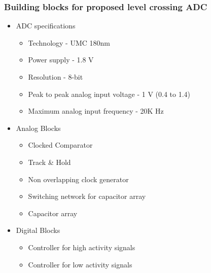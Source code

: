 \documentclass{beamer}
\begin{document}
\begin{frame}
	\frametitle{Building blocks for proposed level crossing ADC} \footnotesize
	\begin{itemize} 
		\item{ ADC specifications}
			\begin{itemize} \scriptsize
				\item{ Technology - UMC 180nm } \\
				\item{ Power supply - 1.8 V } \\
				\item{ Resolution - 8-bit  } \\
				\item{ Peak to peak analog input voltage - 1 V (0.4 to 1.4)} \\
				\item{ Maximum analog input frequency - 20K Hz } \\
			\end{itemize}
		\item{ Analog Blocks }\\
			\begin{itemize} \scriptsize
				\item{ Clocked Comparator } \\
				\item{ Track \& Hold } \\
				\item{ Non overlapping clock generator } \\
				\item{ Switching network for capacitor array } \\
				\item{ Capacitor array  } \\
			\end{itemize}
		\item{ Digital Blocks }
			\begin{itemize} \scriptsize
				\item{ Controller for high activity signals } \\
				\item{ Controller for low activity signals } \\
			\end{itemize}	
	\end{itemize}
\end{frame}
\end{document}
